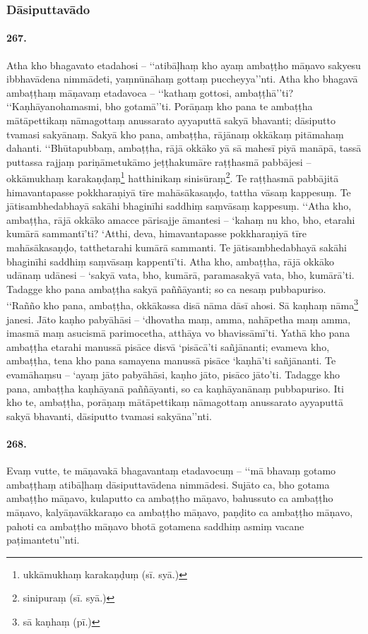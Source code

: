 \subsubsection{Dāsiputtavādo}

\paragraph{267.} Atha kho bhagavato etadahosi – ‘‘atibāḷhaṃ kho ayaṃ ambaṭṭho māṇavo sakyesu ibbhavādena nimmādeti, yaṃnūnāhaṃ gottaṃ puccheyya’’nti. Atha kho bhagavā ambaṭṭhaṃ māṇavaṃ etadavoca – ‘‘kathaṃ gottosi, ambaṭṭhā’’ti? ‘‘Kaṇhāyanohamasmi, bho gotamā’’ti. Porāṇaṃ kho pana te ambaṭṭha mātāpettikaṃ nāmagottaṃ anussarato ayyaputtā sakyā bhavanti; dāsiputto tvamasi sakyānaṃ. Sakyā kho pana, ambaṭṭha, rājānaṃ okkākaṃ pitāmahaṃ dahanti. ‘‘Bhūtapubbaṃ, ambaṭṭha, rājā okkāko yā sā mahesī piyā manāpā, tassā puttassa rajjaṃ pariṇāmetukāmo jeṭṭhakumāre raṭṭhasmā pabbājesi – okkāmukhaṃ karakaṇḍaṃ\footnote{ukkāmukhaṃ karakaṇḍuṃ (sī. syā.)} hatthinikaṃ sinisūraṃ\footnote{sinipuraṃ (sī. syā.)}. Te raṭṭhasmā pabbājitā himavantapasse pokkharaṇiyā tīre mahāsākasaṇḍo, tattha vāsaṃ kappesuṃ. Te jātisambhedabhayā sakāhi bhaginīhi saddhiṃ saṃvāsaṃ kappesuṃ. ‘‘Atha kho, ambaṭṭha, rājā okkāko amacce pārisajje āmantesi – ‘kahaṃ nu kho, bho, etarahi kumārā sammantī’ti? ‘Atthi, deva, himavantapasse pokkharaṇiyā tīre mahāsākasaṇḍo, tatthetarahi kumārā sammanti. Te jātisambhedabhayā sakāhi bhaginīhi saddhiṃ saṃvāsaṃ kappentī’ti. Atha kho, ambaṭṭha, rājā okkāko udānaṃ udānesi – ‘sakyā vata, bho, kumārā, paramasakyā vata, bho, kumārā’ti. Tadagge kho pana ambaṭṭha sakyā paññāyanti; so ca nesaṃ pubbapuriso. ‘‘Rañño kho pana, ambaṭṭha, okkākassa disā nāma dāsī ahosi. Sā kaṇhaṃ nāma\footnote{sā kaṇhaṃ (pī.)} janesi. Jāto kaṇho pabyāhāsi – ‘dhovatha maṃ, amma, nahāpetha maṃ amma, imasmā maṃ asucismā parimocetha, atthāya vo bhavissāmī’ti. Yathā kho pana ambaṭṭha etarahi manussā pisāce disvā ‘pisācā’ti sañjānanti; evameva kho, ambaṭṭha, tena kho pana samayena manussā pisāce ‘kaṇhā’ti sañjānanti. Te evamāhaṃsu – ‘ayaṃ jāto pabyāhāsi, kaṇho jāto, pisāco jāto’ti. Tadagge kho pana, ambaṭṭha kaṇhāyanā paññāyanti, so ca kaṇhāyanānaṃ pubbapuriso. Iti kho te, ambaṭṭha, porāṇaṃ mātāpettikaṃ nāmagottaṃ anussarato ayyaputtā sakyā bhavanti, dāsiputto tvamasi sakyāna’’nti.

\paragraph{268.} Evaṃ vutte, te māṇavakā bhagavantaṃ etadavocuṃ – ‘‘mā bhavaṃ gotamo ambaṭṭhaṃ atibāḷhaṃ dāsiputtavādena nimmādesi. Sujāto ca, bho gotama ambaṭṭho māṇavo, kulaputto ca ambaṭṭho māṇavo, bahussuto ca ambaṭṭho māṇavo, kalyāṇavākkaraṇo ca ambaṭṭho māṇavo, paṇḍito ca ambaṭṭho māṇavo, pahoti ca ambaṭṭho māṇavo bhotā gotamena saddhiṃ asmiṃ vacane paṭimantetu’’nti.

